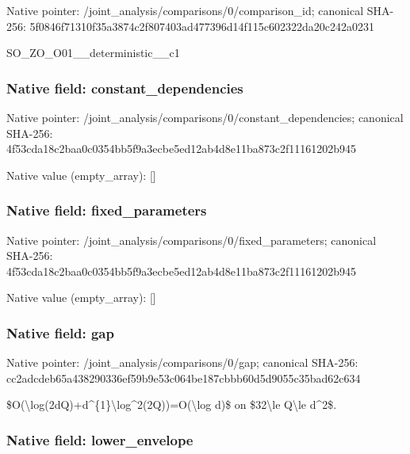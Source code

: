 \documentclass[10pt,a4paper]{article}
\begin{document}
Native pointer: /joint\_analysis/comparis\allowbreak{}ons/0/comparison\_id; canonical SHA-256: 5f0846f71310f35a3874c2f8\allowbreak{}07403ad477396d14f115c602\allowbreak{}322da20c242a0231


SO\_ZO\_O01\_\_deterministic\_\_c1


\subsubsection{Native field: constant\_dependencies}


Native pointer: /joint\_analysis/comparis\allowbreak{}ons/0/constant\_dependenc\allowbreak{}ies; canonical SHA-256: 4f53cda18c2baa0c0354bb5f\allowbreak{}9a3ecbe5ed12ab4d8e11ba87\allowbreak{}3c2f11161202b945



Native value (empty\_array): []



\subsubsection{Native field: fixed\_parameters}


Native pointer: /joint\_analysis/comparis\allowbreak{}ons/0/fixed\_parameters; canonical SHA-256: 4f53cda18c2baa0c0354bb5f\allowbreak{}9a3ecbe5ed12ab4d8e11ba87\allowbreak{}3c2f11161202b945



Native value (empty\_array): []



\subsubsection{Native field: gap}


Native pointer: /joint\_analysis/comparisons/0/gap; canonical SHA-256: cc2adcdeb65a438290336ef5\allowbreak{}9b9e53c064be187cbbb60d5d\allowbreak{}9055c35bad62c634


\$O(\textbackslash{}log(2dQ)+d\textasciicircum{}\{1\}\textbackslash{}log\textasciicircum{}2(2Q))=O(\textbackslash{}log d)\$ on \$32\textbackslash{}le Q\textbackslash{}le d\textasciicircum{}2\$.


\subsubsection{Native field: lower\_envelope}
\end{document}
